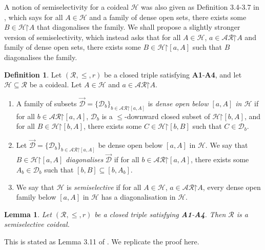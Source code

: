 \documentclass[10pt,a4paper]{amsart}
\theoremstyle{plain}
\numberwithin{equation}{section}
\newtheorem{lemma}[theorem]{Lemma}
\theoremstyle{definition}
\newtheorem{definition}[theorem]{Definition}
\newcommand{\cal}{\mathcal}
\newcommand{\restrictedto}{\mathord{\upharpoonright}}
\renewcommand{\H}{\cal{H}}
\newcommand{\D}{\cal{D}}
\begin{document}
A notion of semiselectivity for a coideal $\H$ was also given as Definition 3.4-3.7 in \cite{DMN15}, which says for all $A \in \H$ and a family of dense open sets, there exists some $B \in \H\restrictedto A$ that diagonalises the family. We shall propose a slightly stronger version of semiselectivity, which instead asks that for all $A \in \H$, $a \in \cal{AR}\restrictedto A$ and family of dense open sets, there exists some $B \in \H\restrictedto[a,A]$ such that $B$ diagonalises the family.

\begin{definition}
\label{def:semiselective}
    Let $(\cal{R},\leq,r)$ be a closed triple satisfying \textbf{A1}-\textbf{A4}, and let $\H \subseteq \cal{R}$ be a coideal. Let $A \in \H$ and $a \in \cal{AR}\restrictedto A$.
    \begin{enumerate}
        \item A family of subsets $\vec{\D} = \{\D_b\}_{b \in \cal{AR}\restrictedto[a,A]}$ is \emph{dense open below $[a,A]$ in $\H$} if for all $b \in \cal{AR}\restrictedto[a,A]$, $\D_b$ is a $\leq$-downward closed subset of $\H\restrictedto[b,A]$, and for all $B \in \H\restrictedto[b,A]$, there exists some $C \in \H\restrictedto[b,B]$ such that $C \in \D_b$.
        
        \item Let $\vec{\D} = \{\D_b\}_{b \in \cal{AR}\restrictedto[a,A]}$ be dense open below $[a,A]$ in $\H$. We say that $B \in \H\restrictedto[a,A]$ \emph{diagonalises} $\vec{\D}$ if for all $b \in \cal{AR}\restrictedto[a,A]$, there exists some $A_b \in \D_b$ such that $[b,B] \subseteq [b,A_b]$.

        \item We say that $\H$ is \emph{semiselective} if for all $A \in \H$, $a \in \cal{AR}\restrictedto A$, every dense open family below $[a,A]$ in $\H$ has a diagonalisation in $\H$.
    \end{enumerate}
\end{definition}

\begin{lemma}
    Let $(\cal{R},\leq,r)$ be a closed triple satisfying \textbf{A1}-\textbf{A4}. Then $\cal{R}$ is a semiselective coideal.
\end{lemma}

This is stated as Lemma 3.11 of \cite{Y24}. We replicate the proof here. 
\end{document}

